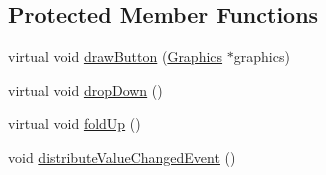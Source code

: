 \subsection*{Protected Member Functions}
\begin{DoxyCompactItemize}
\item 
virtual void \hyperlink{classgcn_1_1DropDown_ae4dd73bd704e8801d25e858a19a5e5e4}{draw\+Button} (\hyperlink{classgcn_1_1Graphics}{Graphics} $\ast$graphics)
\item 
virtual void \hyperlink{classgcn_1_1DropDown_aa26df3e489e7982446381c782578bbbb}{drop\+Down} ()
\item 
virtual void \hyperlink{classgcn_1_1DropDown_a6fa979a9064a33f72f4bc7ca6733fe69}{fold\+Up} ()
\item 
void \hyperlink{classgcn_1_1DropDown_abbb9a251110710fa2af114476c6a4c23}{distribute\+Value\+Changed\+Event} ()
\end{DoxyCompactItemize}
